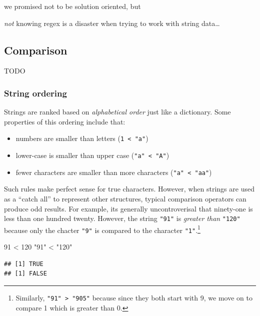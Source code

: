 \documentclass[
]{krantz}
\makeatletter
\newenvironment{Shaded}{\begin{snugshade}}{\end{snugshade}}
\newcommand{\DecValTok}[1]{\textcolor[rgb]{0.06,0.06,0.06}{#1}}
\newcommand{\SpecialCharTok}[1]{\textcolor[rgb]{0,0,0}{#1}}
\newcommand{\StringTok}[1]{\textcolor[rgb]{0.5,0.5,0.5}{#1}}
\providecommand{\tightlist}{%
  \setlength{\itemsep}{0pt}\setlength{\parskip}{0pt}}
\newenvironment{kframe}{%
\medskip{}
\setlength{\fboxsep}{.8em}
 \def\at@end@of@kframe{}%
 \ifinner\ifhmode%
  \def\at@end@of@kframe{\end{minipage}}%
  \begin{minipage}{\columnwidth}%
 \fi\fi%
 \def\FrameCommand##1{\hskip\@totalleftmargin \hskip-\fboxsep
 \colorbox{shadecolor}{##1}\hskip-\fboxsep
     \hskip-\linewidth \hskip-\@totalleftmargin \hskip\columnwidth}%
 \MakeFramed {\advance\hsize-\width
   \@totalleftmargin\z@ \linewidth\hsize
   \@setminipage}}%
 {\par\unskip\endMakeFramed%
 \at@end@of@kframe}
\renewenvironment{Shaded}{\begin{kframe}}{\end{kframe}}
\makeatother
\begin{document}
we promised not to be solution oriented, but

\emph{not} knowing regex is a disaster when trying to work with string data\ldots{}

\hypertarget{comparison-1}{%
\subsection{Comparison}\label{comparison-1}}

TODO

\hypertarget{string-ordering}{%
\subsubsection{String ordering}\label{string-ordering}}

Strings are ranked based on \emph{alphabetical order} just like a dictionary. Some properties of this ordering include that:

\begin{itemize}
\tightlist
\item
  numbers are smaller than letters (\texttt{1\ \textless{}\ "a"})
\item
  lower-case is smaller than upper case (\texttt{"a"\ \textless{}\ "A"})
\item
  fewer characters are smaller than more characters (\texttt{"a"\ \textless{}\ "aa"})
\end{itemize}

Such rules make perfect sense for true characters. However, when strings are used as a ``catch all'' to represent other structures, typical comparison operators can produce odd results. For example, its generally uncontroverisal that ninety-one is less than one hundred twenty. However, the string \texttt{"91"} is \emph{greater than} \texttt{"120"} because only the chacter \texttt{"9"} is compared to the character \texttt{"1"}.\footnote{Similarly, \texttt{"91"\ \textgreater{}\ "905"} because since they both start with 9, we move on to compare 1 which is greater than 0.}

\begin{Shaded}
\begin{Highlighting}[]
\DecValTok{91} \SpecialCharTok{\textless{}} \DecValTok{120}
\StringTok{"91"} \SpecialCharTok{\textless{}} \StringTok{"120"}
\end{Highlighting}
\end{Shaded}

\begin{verbatim}
## [1] TRUE
## [1] FALSE
\end{verbatim}
\end{document}
